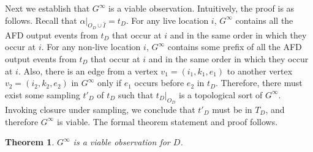 \documentclass[11pt]{article}
\newtheorem{theorem}{Theorem}
\numberwithin{theorem}{section}
\begin{document}
 Next we establish that $G^\infty$ is a viable observation. Intuitively, the proof is as follows. Recall that $\alpha|_{O_D \cup \hat{I}} = t_D$. For any live location $i$, $G^\infty$ contains all the AFD output events from $t_D$ that occur at $i$ and in the same order in which they occur at $i$. For any non-live location $i$, $G^\infty$ contains some prefix of all the AFD output events from $t_D$ that occur at $i$ and in the same order in which they occur at $i$. Also, there is an edge from a vertex $v_1 = (i_1,k_1,e_1)$ to another vertex $v_2 = (i_2,k_2,e_2)$ in $G^\infty$ only if $e_1$ occurs before $e_2$ in $t_D$. Therefore, there must exist some sampling $t'_D$ of $t_D$ such that $t_D|_{O_D}$ is a topological sort of $G^\infty$. Invoking closure under sampling, we conclude that $t'_D$ must be in $T_D$, and therefore $G^\infty$ is viable. The formal theorem statement and proof follows.
 
 \begin{theorem}\label{thm:GinftyIsViable}
 $G^\infty$ is a viable observation for $D$.
 \end{theorem}
\end{document}
